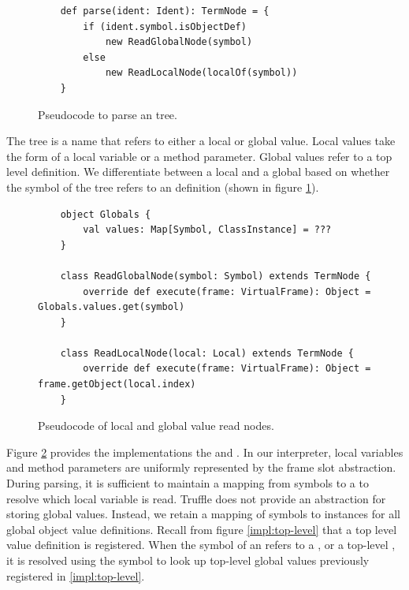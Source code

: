 \begin{figure}[!htb]
	\begin{verbatim}
	def parse(ident: Ident): TermNode = {
		if (ident.symbol.isObjectDef)
			new ReadGlobalNode(symbol)
		else 
			new ReadLocalNode(localOf(symbol))
	}
	\end{verbatim}
	\caption{Pseudocode to parse an  tree.}
	\label{impl:parse-ident}
\end{figure}

The  tree is a name that refers to either a local or global value.
Local values take the form of a local variable or a method parameter.
Global values refer to a top level  definition.
We differentiate between a local and a global based on whether the symbol of the  tree refers to an  definition (shown in figure \ref{impl:parse-ident}).

\begin{figure}[!htb]
	\begin{verbatim}
	object Globals {
		val values: Map[Symbol, ClassInstance] = ???
	}
	
	class ReadGlobalNode(symbol: Symbol) extends TermNode {
		override def execute(frame: VirtualFrame): Object = Globals.values.get(symbol)
	}

	class ReadLocalNode(local: Local) extends TermNode {
		override def execute(frame: VirtualFrame): Object = frame.getObject(local.index)
	}
	\end{verbatim}
	\caption{Pseudocode of local and global value read nodes.}
	\label{impl:local-global-node}
\end{figure}
Figure \ref{impl:local-global-node} provides the implementations the  and .
In our interpreter, local variables and method parameters are uniformly represented by the frame slot abstraction.
During parsing, it is sufficient to maintain a mapping from symbols to a  to resolve which local variable is read.
Truffle does not provide an abstraction for storing global values.
Instead, we retain a mapping of symbols to instances for all global object value definitions.
Recall from figure \ref{impl:top-level} that a top level value definition is registered.
When the symbol of an  refers to a , or a top-level , it is resolved using the symbol to look up top-level global values previously registered in \ref{impl:top-level}.

